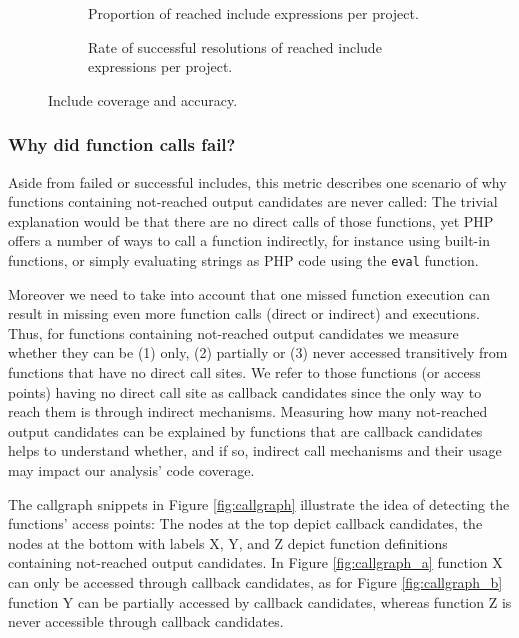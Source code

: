 \documentclass[preprint]{sig-alternate-05-2015}
\begin{document}
\begin{figure}[t!]
    \centering
    \begin{subfigure}[t]{0.5 \textwidth}    	
        \centering        
				
        \caption{Proportion of reached include expressions per project.}
        \label{fig:include_coverage_results1}
    \end{subfigure}%
	\hfill
    \begin{subfigure}[t]{0.5\textwidth}    
        \centering
                
        \caption{Rate of successful resolutions of reached include expressions
        per project.}
        \label{fig:include_coverage_results2}
    \end{subfigure}
    \label{fig:include_coverage_results}
    \caption{Include coverage and accuracy.}
\end{figure}

\subsubsection{Why did function calls fail?}
\label{WhyDidFunctionCallsFail}
Aside from failed or successful includes, this metric describes one scenario of why functions containing not-reached output candidates are never called: The trivial explanation would be that there are no direct calls of those functions, yet PHP offers a number of ways to call a function indirectly, for instance using built-in functions, or simply evaluating strings as PHP code using the \texttt{eval} function. 

Moreover we need to take into account that one missed function execution can result in missing even more function calls (direct or indirect) and executions. Thus, for functions containing not-reached output candidates we measure whether they can be (1) only, (2) partially or (3) never accessed transitively from functions that have no direct call sites. We refer to those functions (or access points) having no direct call site as callback candidates since the only way to reach them is through indirect mechanisms. Measuring how many not-reached output candidates can be explained by functions that are callback candidates helps to understand whether, and if so, indirect call mechanisms and their usage may impact our analysis’ code coverage.

The callgraph snippets in Figure \ref{fig:callgraph} illustrate the idea of detecting the functions’ access points: The nodes at the top depict callback candidates, the nodes at the bottom with labels X, Y, and Z depict function definitions containing not-reached output candidates. In Figure \ref{fig:callgraph_a} function X can only be accessed through callback candidates, as for Figure \ref{fig:callgraph_b} function Y can be partially accessed by callback candidates, whereas function Z is never accessible through callback candidates.
\end{document}
